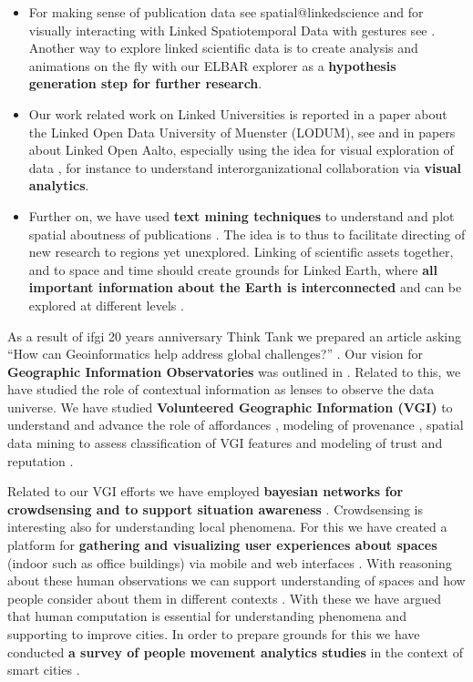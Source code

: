 \documentclass[11pt,letterpaper]{article}
\begin{document}
\begin{itemize}
	   \item For making sense of publication data see spatial@linkedscience
		\cite{spatialatlinkedscience2012} and for visually interacting with Linked
		Spatiotemporal Data with gestures see \cite{dreieck2013}. Another way to
		explore linked scientific data is to create analysis and animations on the fly
		with our ELBAR explorer \cite{elbar-2014} as a \textbf{hypothesis generation
		step for further research}.
		\item Our work related work on Linked Universities is reported in a paper about the Linked Open Data University of Muenster (LODUM), see
\cite{kessler-kauppinen-lodum-2012} and in papers about Linked Open Aalto, especially using the idea for visual exploration of data \cite{datavisu-eswc-2013}, for instance to understand interorganizational collaboration \cite{hukkinen-kauppinen-2014} via \textbf{visual analytics}.
\item Further on, we have used \textbf{text mining techniques}
 to understand and plot spatial aboutness of publications \cite{spatialaboutness2015}. The idea is to thus to facilitate directing of new research to regions yet unexplored. Linking of scientific assets together, and to space and time
 should create grounds for Linked Earth, where \textbf{all important information about the Earth is interconnected} and can be explored at different levels \cite{linkedearth-2014}.
\end{itemize}

As a result of ifgi 20 years
		anniversary Think Tank we prepared an article asking ``How can Geoinformatics
		help address global challenges?'' \cite{geoinfo-global-challenges}.
		Our vision for \textbf{Geographic Information Observatories} was outlined in
		 \cite{tgio-2014}. Related to this, we have studied the role of contextual information \cite{contextual-2015} as lenses to observe the data universe.
		We have
		studied \textbf{Volunteered Geographic Information (VGI)} to understand and advance the role of affordances
 		\cite{geosensor-data-and-vgi-2010}, modeling of provenance \cite{openstreetmap-provenance-2011}
  		\cite{openstreetmap-editing-2011} \cite{ontomaps2012}, spatial data mining to assess classification of VGI features \cite{vgi-acmsigspatial2014} and modeling of trust and reputation \cite{dantonio2014}.

Related to our VGI efforts we have employed \textbf{bayesian networks for
crowdsensing and to support situation awareness}
\cite{crowdsensing-bayesian-2015}. Crowdsensing is interesting also for
understanding local phenomena. For this we have created a platform for
\textbf{gathering and visualizing user experiences about spaces} (indoor such as
office buildings) via mobile and web interfaces \cite{yousense-2014}. With
reasoning about these human observations we can support understanding of spaces
and how people consider about them in different contexts \cite{reasoning-indoor-2018}. With these we have argued that human computation is essential for understanding phenomena and supporting to improve cities. In order to prepare grounds for this we have conducted  \textbf{a survey of people movement analytics studies} in the context of smart cities \cite{survey-movement-analytics}.
\end{document}
